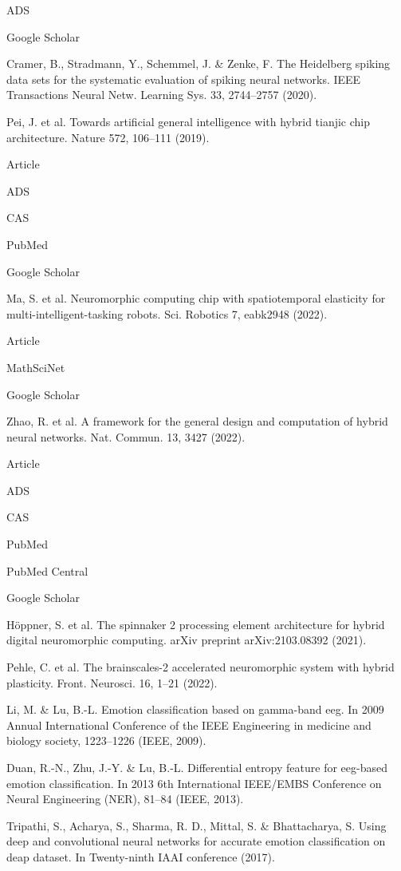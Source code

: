 ADS
 
Google Scholar
 

Cramer, B., Stradmann, Y., Schemmel, J. & Zenke, F. The Heidelberg spiking data sets for the systematic evaluation of spiking neural networks. IEEE Transactions Neural Netw. Learning Sys. 33, 2744–2757 (2020).

Pei, J. et al. Towards artificial general intelligence with hybrid tianjic chip architecture. Nature 572, 106–111 (2019).

Article
 
ADS
 
CAS
 
PubMed
 
Google Scholar
 

Ma, S. et al. Neuromorphic computing chip with spatiotemporal elasticity for multi-intelligent-tasking robots. Sci. Robotics 7, eabk2948 (2022).

Article
 
MathSciNet
 
Google Scholar
 

Zhao, R. et al. A framework for the general design and computation of hybrid neural networks. Nat. Commun. 13, 3427 (2022).

Article
 
ADS
 
CAS
 
PubMed
 
PubMed Central
 
Google Scholar
 

Höppner, S. et al. The spinnaker 2 processing element architecture for hybrid digital neuromorphic computing. arXiv preprint arXiv:2103.08392 (2021).

Pehle, C. et al. The brainscales-2 accelerated neuromorphic system with hybrid plasticity. Front. Neurosci. 16, 1–21 (2022).

Li, M. & Lu, B.-L. Emotion classification based on gamma-band eeg. In 2009 Annual International Conference of the IEEE Engineering in medicine and biology society, 1223–1226 (IEEE, 2009).

Duan, R.-N., Zhu, J.-Y. & Lu, B.-L. Differential entropy feature for eeg-based emotion classification. In 2013 6th International IEEE/EMBS Conference on Neural Engineering (NER), 81–84 (IEEE, 2013).

Tripathi, S., Acharya, S., Sharma, R. D., Mittal, S. & Bhattacharya, S. Using deep and convolutional neural networks for accurate emotion classification on deap dataset. In Twenty-ninth IAAI conference (2017).

